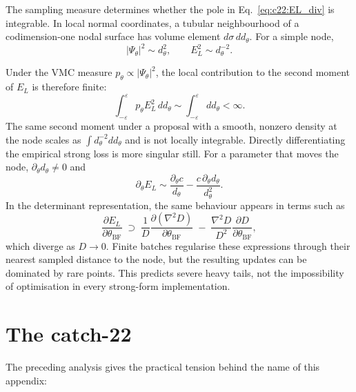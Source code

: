 The sampling measure determines whether the pole in Eq.~\eqref{eq:c22:EL_div} is
integrable. In local normal coordinates, a tubular neighbourhood of a codimension-one
nodal surface has volume element $d\sigma\,dd_\theta$. For a simple node,
\begin{equation}
|\Psi_\theta|^2\sim d_\theta^2,
\qquad
E_L^2\sim d_\theta^{-2}.
\label{eq:c22:scaling}
\end{equation}

Under the VMC measure $p_\theta\propto|\Psi_\theta|^2$, the local contribution to
the second moment of $E_L$ is therefore finite:
\begin{equation}
\int_{-\varepsilon}^{\varepsilon}p_\theta E_L^2\,dd_\theta
\sim\int_{-\varepsilon}^{\varepsilon}dd_\theta<\infty.
\label{eq:c22:integrand}
\end{equation}
The same second moment under a proposal with a smooth, nonzero density at the node
scales as $\int d_\theta^{-2}dd_\theta$ and is not locally integrable. Directly
differentiating the empirical strong loss is more singular still. For a parameter that
moves the node, $\partial_\theta d_\theta\neq0$ and
\begin{equation}
\partial_\theta E_L
\sim \frac{\partial_\theta c}{d_\theta}
-\frac{c\,\partial_\theta d_\theta}{d_\theta^2}.
\label{eq:c22:grad_EL_local}
\end{equation}
In the determinant representation, the same behaviour appears in terms such as
\begin{equation}
\frac{\partial E_L}{\partial\theta_{\mathrm{BF}}}
\;\supset\;
\frac{1}{D}\frac{\partial(\nabla^2 D)}{\partial\theta_{\mathrm{BF}}}
\;-\;
\frac{\nabla^2 D}{D^2}
\frac{\partial D}{\partial\theta_{\mathrm{BF}}},
\label{eq:c22:grad_EL}
\end{equation}
which diverge as $D\to0$. Finite batches regularise these expressions through their
nearest sampled distance to the node, but the resulting updates can be dominated by rare
points. This predicts severe heavy tails, not the impossibility of optimisation in every
strong-form implementation.


\section{The catch-22}
\label{app:catch22:statement}

The preceding analysis gives the practical tension behind the name of this appendix:

